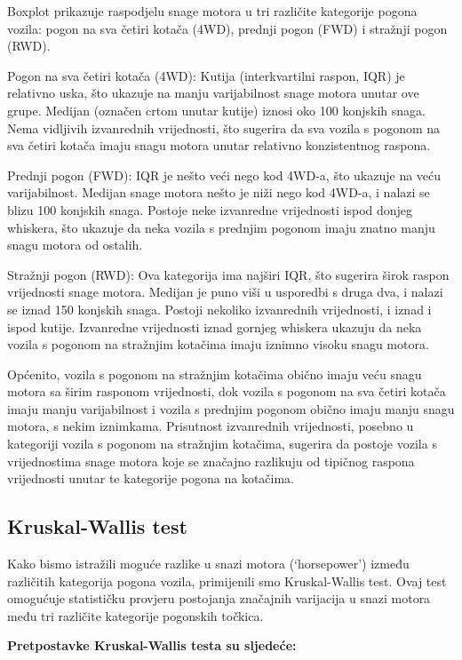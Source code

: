 \documentclass[
]{article}
\begin{document}
Boxplot prikazuje raspodjelu snage motora u tri različite kategorije
pogona vozila: pogon na sva četiri kotača (4WD), prednji pogon (FWD) i
stražnji pogon (RWD).

Pogon na sva četiri kotača (4WD): Kutija (interkvartilni raspon, IQR) je
relativno uska, što ukazuje na manju varijabilnost snage motora unutar
ove grupe. Medijan (označen crtom unutar kutije) iznosi oko 100 konjskih
snaga. Nema vidljivih izvanrednih vrijednosti, što sugerira da sva
vozila s pogonom na sva četiri kotača imaju snagu motora unutar
relativno konzistentnog raspona.

Prednji pogon (FWD): IQR je nešto veći nego kod 4WD-a, što ukazuje na
veću varijabilnost. Medijan snage motora nešto je niži nego kod 4WD-a, i
nalazi se blizu 100 konjskih snaga. Postoje neke izvanredne vrijednosti
ispod donjeg whiskera, što ukazuje da neka vozila s prednjim pogonom
imaju znatno manju snagu motora od ostalih.

Stražnji pogon (RWD): Ova kategorija ima najširi IQR, što sugerira širok
raspon vrijednosti snage motora. Medijan je puno viši u usporedbi s
druga dva, i nalazi se iznad 150 konjskih snaga. Postoji nekoliko
izvanrednih vrijednosti, i iznad i ispod kutije. Izvanredne vrijednosti
iznad gornjeg whiskera ukazuju da neka vozila s pogonom na stražnjim
kotačima imaju iznimno visoku snagu motora.

Općenito, vozila s pogonom na stražnjim kotačima obično imaju veću snagu
motora sa širim rasponom vrijednosti, dok vozila s pogonom na sva četiri
kotača imaju manju varijabilnost i vozila s prednjim pogonom obično
imaju manju snagu motora, s nekim iznimkama. Prisutnost izvanrednih
vrijednosti, posebno u kategoriji vozila s pogonom na stražnjim
kotačima, sugerira da postoje vozila s vrijednostima snage motora koje
se značajno razlikuju od tipičnog raspona vrijednosti unutar te
kategorije pogona na kotačima.

\subsection{Kruskal-Wallis test}\label{kruskal-wallis-test}

Kako bismo istražili moguće razlike u snazi motora (`horsepower') između
različitih kategorija pogona vozila, primijenili smo Kruskal-Wallis
test. Ovaj test omogućuje statističku provjeru postojanja značajnih
varijacija u snazi motora među tri različite kategorije pogonskih
točkica.

\textbf{Pretpostavke Kruskal-Wallis testa su sljedeće:}
\end{document}
